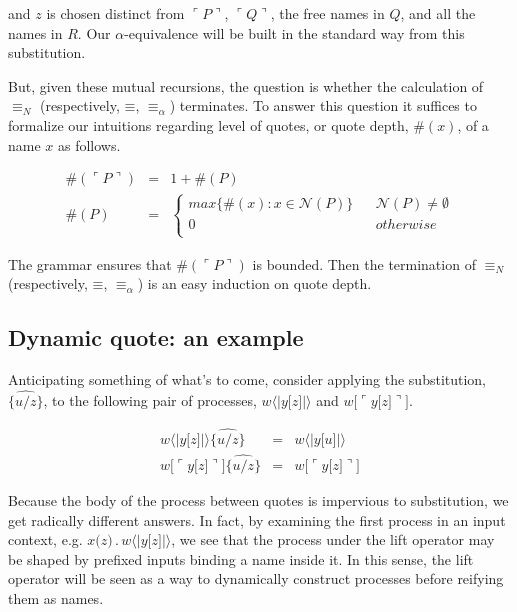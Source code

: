 \documentclass[]{entcs}
\newcommand{\lliftb}{\langle\!|}
\newcommand{\rliftb}{|\!\rangle}
\newcommand{\lpquote}{\ulcorner}
\newcommand{\rpquote}{\urcorner}
\newcommand{\id}[1]{\texttt{#1}}
\newcommand{\concat}{\mathbin{.}}
\newcommand{\scong}{\mathbin{\equiv}}
\newcommand{\nameeq}{\mathbin{\equiv_N}}
\newcommand{\alphaeq}{\mathbin{\equiv_{\alpha}}}
\newcommand{\names}[1]{\mathbin{\mathcal{N}(#1)}}
\newcommand{\lift}[2]{#1 \lliftb #2 \rliftb}
\newcommand{\quotep}[1]{\lpquote #1 \rpquote}
\begin{document}
and $z$ is chosen distinct from $\quotep{P}$, $\quotep{Q}$, the free
names in $Q$, and all the names in $R$. Our $\alpha$-equivalence will
be built in the standard way from this substitution.

But, given these mutual recursions, the question is whether the calculation
of $\nameeq$ (respectively, $\scong$, $\alphaeq$) terminates. To
answer this question it suffices to formalize our intuitions regarding
level of quotes, or quote depth, $\#(x)$, of a name $x$ as
follows.

\begin{eqnarray}
	\#(\quotep{P}) & = & 1 + \#(P) \nonumber\\
    \#(P) & = & \left\{
			   \begin{array}{ccc}
				 max\{ \#(x) : x \in \names{P} \} & & \names{P} \neq \emptyset \\
				 0 & & otherwise \\
			   \end{array}
			\right. \nonumber
\end{eqnarray}

The grammar ensures that $\#(\quotep{P})$ is bounded. Then the
termination of $\nameeq$ (respectively, $\scong$, $\alphaeq$) is an
easy induction on quote depth.

\subsection{ Dynamic quote: an example }

Anticipating something of what's to come, consider applying the
substitution, $\widehat{\id{\{}u / z \id{\}}}$, to the following pair
of processes, $\lift{w}{y \id{[}z\id{]}}$ and $w\id{[} \lpquote
y\id{[}z\id{]} \rpquote \id{]}$.

\begin{eqnarray}
	\lift{w}{y \id{[}z\id{]}}\widehat{\id{\{}u / z \id{\}}}
		& = &
		\lift{w}{y \id{[}u\id{]}} \nonumber\\
	w\id{[} \lpquote y\id{[}z\id{]} \rpquote \id{]} \widehat{ \id{\{}u / z \id{\}} }
		& = &
		w\id{[} \lpquote y\id{[}z\id{]} \rpquote \id{]} \nonumber
\end{eqnarray}

Because the body of the process between quotes is impervious to
substitution, we get radically different answers. In fact, by
examining the first process in an input context, e.g. $x \id{(} z
\id{)}\concat \lift{w}{y
\id{[}z\id{]}}$, we see that the process under the lift operator may
be shaped by prefixed inputs binding a name inside it. In this sense,
the lift operator will be seen as a way to dynamically construct
processes before reifying them as names.
\end{document}
